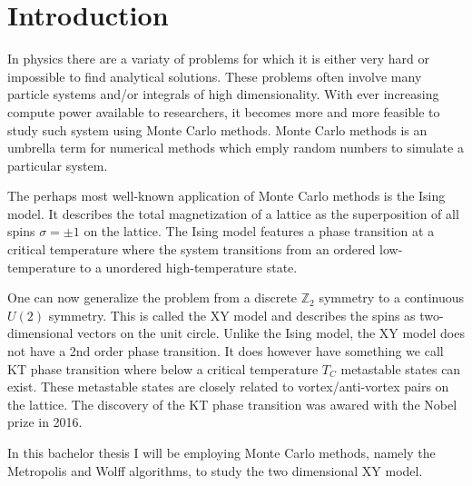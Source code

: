 \chapter{Introduction}\label{chap:introduction}
	In physics there are a variaty of problems for which it is either very hard or impossible to find analytical solutions. These problems often involve many particle systems and/or integrals of high dimensionality. With ever increasing compute power available to researchers, it becomes more and more feasible to study such system using Monte Carlo methods. Monte Carlo methods is an umbrella term for numerical methods which emply random numbers to simulate a particular system.
	
	The perhaps most well-known application of Monte Carlo methods is the Ising model.  It describes the total magnetization of a lattice as the superposition of
	all spins $\sigma = \pm 1$ on the lattice. The Ising model features a phase transition at a critical temperature where the system transitions from an ordered low-temperature to a unordered high-temperature state.
	
	One can now generalize the problem from a discrete $\mathbb{Z}_2$ symmetry to a continuous $U(2)$ symmetry. This is called the XY model and describes the spins as two-dimensional vectors on the unit circle. Unlike the Ising model, the XY model does not have a 2nd order phase transition. It does however have something we call KT phase transition where below a critical temperature $T_C$ metastable states can exist. These metastable states are closely related to vortex/anti-vortex pairs on the lattice. The discovery of the KT phase transition was awared with the Nobel prize in 2016.
	
	In this bachelor thesis I will be employing Monte Carlo methods, namely the Metropolis and Wolff algorithms, to study the two dimensional XY model. 